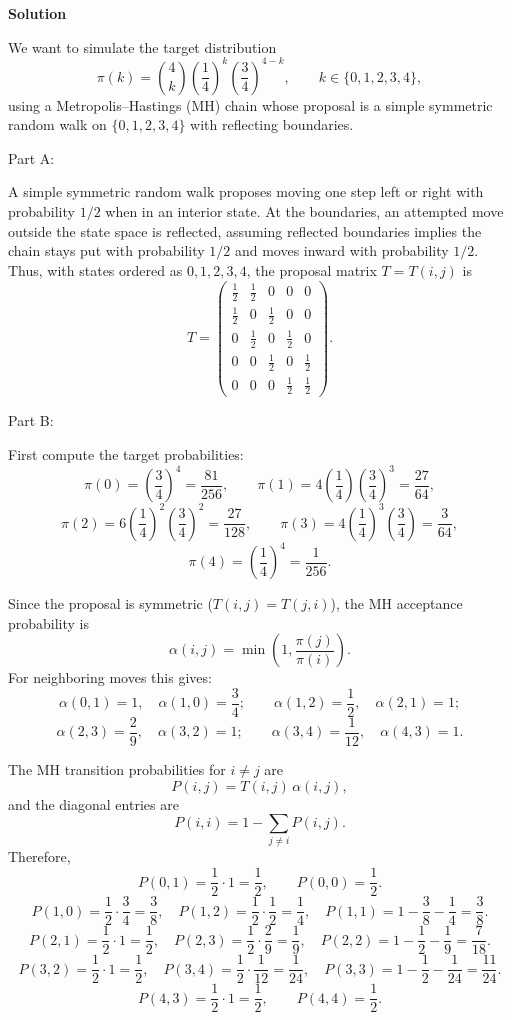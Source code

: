 \documentclass[hidelinks]{article}
\begin{document}
\noindent \textbf{Solution}

\noindent We want to simulate the target distribution
\[
\pi(k)=\binom{4}{k}\left(\frac14\right)^k\left(\frac34\right)^{4-k},\qquad k\in\{0,1,2,3,4\},
\]
using a Metropolis--Hastings (MH) chain whose proposal is a simple symmetric random walk on
\(\{0,1,2,3,4\}\) with reflecting boundaries.

\smallskip

\noindent Part A:

\noindent A simple symmetric random walk proposes moving one step left or right with probability \(1/2\)
when in an interior state. At the boundaries, an attempted move outside the state space is
reflected, assuming reflected boundaries implies the chain stays put with probability \(1/2\) and moves inward with probability \(1/2\).
Thus, with states ordered as \(0,1,2,3,4\), the proposal matrix \(T=T(i,j)\) is
\[
T=
\begin{pmatrix}
\frac12 & \frac12 & 0 & 0 & 0 \\
\frac12 & 0 & \frac12 & 0 & 0 \\
0 & \frac12 & 0 & \frac12 & 0 \\
0 & 0 & \frac12 & 0 & \frac12 \\
0 & 0 & 0 & \frac12 & \frac12
\end{pmatrix}.
\]

\noindent Part B:

\noindent First compute the target probabilities:
\[
\pi(0)=\left(\frac34\right)^4=\frac{81}{256},\qquad
\pi(1)=4\left(\frac14\right)\left(\frac34\right)^3=\frac{27}{64},
\]
\[
\pi(2)=6\left(\frac14\right)^2\left(\frac34\right)^2=\frac{27}{128},\qquad
\pi(3)=4\left(\frac14\right)^3\left(\frac34\right)=\frac{3}{64},
\]
\[
\pi(4)=\left(\frac14\right)^4=\frac{1}{256}.
\]

\noindent Since the proposal is symmetric (\(T(i,j)=T(j,i)\)), the MH acceptance probability is
\[
\alpha(i,j)=\min\left(1,\frac{\pi(j)}{\pi(i)}\right).
\]
For neighboring moves this gives:
\[
\alpha(0,1)=1,\quad \alpha(1,0)=\frac34;\qquad
\alpha(1,2)=\frac12,\quad \alpha(2,1)=1;
\]
\[
\alpha(2,3)=\frac{2}{9},\quad \alpha(3,2)=1;\qquad
\alpha(3,4)=\frac{1}{12},\quad \alpha(4,3)=1.
\]

\noindent The MH transition probabilities for \(i\neq j\) are
\[
P(i,j)=T(i,j)\,\alpha(i,j),
\]
and the diagonal entries are
\[
P(i,i)=1-\sum_{j\neq i}P(i,j).
\]
Therefore,
\[
P(0,1)=\frac12\cdot 1=\frac12,\qquad P(0,0)=\frac12.
\]
\[
P(1,0)=\frac12\cdot\frac34=\frac38,\quad
P(1,2)=\frac12\cdot\frac12=\frac14,\quad
P(1,1)=1-\frac38-\frac14=\frac38.
\]
\[
P(2,1)=\frac12\cdot 1=\frac12,\quad
P(2,3)=\frac12\cdot\frac{2}{9}=\frac19,\quad
P(2,2)=1-\frac12-\frac19=\frac{7}{18}.
\]
\[
P(3,2)=\frac12\cdot 1=\frac12,\quad
P(3,4)=\frac12\cdot\frac{1}{12}=\frac{1}{24},\quad
P(3,3)=1-\frac12-\frac{1}{24}=\frac{11}{24}.
\]
\[
P(4,3)=\frac12\cdot 1=\frac12,\qquad P(4,4)=\frac12.
\]
\end{document}
